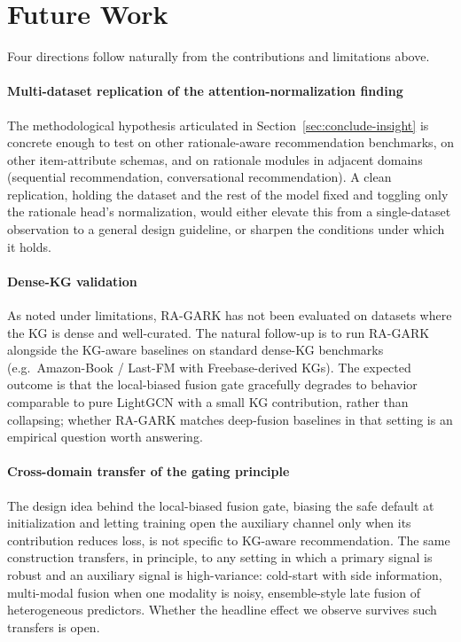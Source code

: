 \section{Future Work}
\label{sec:conclude-future}

Four directions follow naturally from the contributions and limitations above.

\paragraph{Multi-dataset replication of the attention-normalization finding} The methodological hypothesis articulated in Section~\ref{sec:conclude-insight} is concrete enough to test on other rationale-aware recommendation benchmarks, on other item-attribute schemas, and on rationale modules in adjacent domains (sequential recommendation, conversational recommendation). A clean replication, holding the dataset and the rest of the model fixed and toggling only the rationale head's normalization, would either elevate this from a single-dataset observation to a general design guideline, or sharpen the conditions under which it holds.

\paragraph{Dense-KG validation} As noted under limitations, RA-GARK has not been evaluated on datasets where the KG is dense and well-curated. The natural follow-up is to run RA-GARK alongside the KG-aware baselines on standard dense-KG benchmarks (e.g.\ Amazon-Book / Last-FM with Freebase-derived KGs). The expected outcome is that the local-biased fusion gate gracefully degrades to behavior comparable to pure LightGCN with a small KG contribution, rather than collapsing; whether RA-GARK matches deep-fusion baselines in that setting is an empirical question worth answering.

\paragraph{Cross-domain transfer of the gating principle} The design idea behind the local-biased fusion gate, biasing the safe default at initialization and letting training open the auxiliary channel only when its contribution reduces loss, is not specific to KG-aware recommendation. The same construction transfers, in principle, to any setting in which a primary signal is robust and an auxiliary signal is high-variance: cold-start with side information, multi-modal fusion when one modality is noisy, ensemble-style late fusion of heterogeneous predictors. Whether the headline effect we observe survives such transfers is open.

